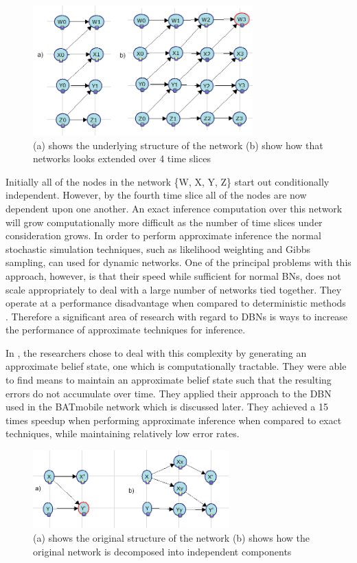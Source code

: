 \documentclass{article}
\begin{document}
\begin{figure}[h]
\begin{center}
\includegraphics[height=50mm]{figures/complexity.png}
\caption{(a) shows the underlying structure of the network  (b) show how that networks looks extended over 4 time slices}
\label{fig:complexity}
\end{center}
\end{figure}

Initially all of the nodes in the network \{W, X, Y, Z\} start out conditionally independent. However, by the fourth time slice all of the nodes are now dependent upon one another. An exact inference computation over this network will grow computationally more difficult as the number of time slices under consideration grows. In order to perform approximate inference the normal stochastic simulation techniques, such as likelihood weighting and Gibbs sampling, can used for dynamic networks. One of the principal problems with this approach, however, is that their speed while sufficient for normal BNs, does not scale appropriately to deal with a large number of networks tied together. They operate at a performance disadvantage when compared to deterministic methods \cite{murphy92}. Therefore a significant area of research with regard to DBNs is ways to increase the performance of approximate techniques for inference. 

In \cite{boyentractable}, the researchers chose to deal with this complexity by generating an approximate belief state, one which is computationally tractable. They were able to find means to maintain an approximate belief state such that the resulting errors do not accumulate over time. They applied their approach to the DBN used in the BATmobile network which is discussed later. They achieved a 15 times speedup when performing approximate inference when compared to exact techniques, while maintaining relatively low error rates. 

\begin{figure}[h]
\begin{center}
\includegraphics[height=30mm]{figures/bk.png}
\caption{(a) shows the original structure of the network  (b) shows how the original network is decomposed into independent components}
\label{fig:bk}
\end{center}
\end{figure}
\end{document}
